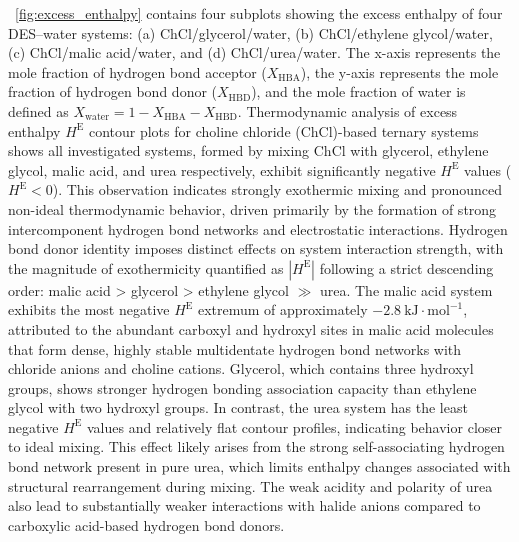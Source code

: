 \documentclass[AMA,LATO2COL]{WileyNJDv5} %
\begin{document}
\figurename~\ref{fig:excess_enthalpy} contains four subplots showing the excess enthalpy of four DES–water systems: (a) ChCl/glycerol/water, (b) ChCl/ethylene glycol/water, (c) ChCl/malic acid/water, and (d) ChCl/urea/water. The x-axis represents the mole fraction of hydrogen bond acceptor ($X_{\text{HBA}}$), the y-axis represents the mole fraction of hydrogen bond donor ($X_{\text{HBD}}$), and the mole fraction of water is defined as $X_{\text{water}} = 1 - X_{\text{HBA}} - X_{\text{HBD}}$. Thermodynamic analysis of excess enthalpy $H^\mathrm{E}$ contour plots for choline chloride (ChCl)-based ternary systems shows all investigated systems, formed by mixing ChCl with glycerol, ethylene glycol, malic acid, and urea respectively, exhibit significantly negative $H^\mathrm{E}$ values ($H^\mathrm{E} < 0$). This observation indicates strongly exothermic mixing and pronounced non-ideal thermodynamic behavior, driven primarily by the formation of strong intercomponent hydrogen bond networks and electrostatic interactions. Hydrogen bond donor identity imposes distinct effects on system interaction strength, with the magnitude of exothermicity quantified as $|H^\mathrm{E}|$ following a strict descending order: malic acid > glycerol > ethylene glycol $\gg$ urea. The malic acid system exhibits the most negative $H^\mathrm{E}$ extremum of approximately $-2.8\ \mathrm{kJ\cdot mol^{-1}}$, attributed to the abundant carboxyl and hydroxyl sites in malic acid molecules that form dense, highly stable multidentate hydrogen bond networks with chloride anions and choline cations. Glycerol, which contains three hydroxyl groups, shows stronger hydrogen bonding association capacity than ethylene glycol with two hydroxyl groups. In contrast, the urea system has the least negative $H^\mathrm{E}$ values and relatively flat contour profiles, indicating behavior closer to ideal mixing. This effect likely arises from the strong self-associating hydrogen bond network present in pure urea, which limits enthalpy changes associated with structural rearrangement during mixing. The weak acidity and polarity of urea also lead to substantially weaker interactions with halide anions compared to carboxylic acid-based hydrogen bond donors.
\end{document}
